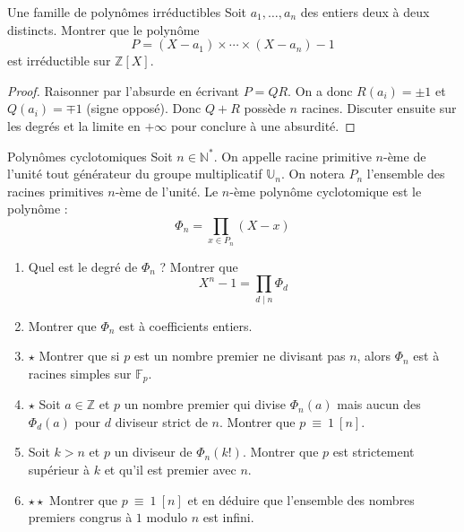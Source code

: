 \documentclass[french,a4paper]{article}
\newcommand{\N}{\mathbb{N}}
\newcommand{\Z}{\mathbb{Z}}
\newcommand{\U}{\mathbb{U}}
\newcommand{\st}{^*}
\newcommand{\F}{\mathbb{F}}
\theoremstyle{plain}
\theoremstyle{definition}
\theoremstyle{remark}
\begin{document}
\begin{ex}[Morlot]{Une famille de polynômes irréductibles}
	Soit $a_1,\ldots,a_n$ des entiers deux à deux distincts. Montrer que le polynôme $$P=(X-a_1)\times\cdots\times(X-a_n)-1$$ est irréductible sur $\Z[X]$.
\end{ex}
\begin{proof}
	Raisonner par l'absurde en écrivant $P=QR$. On a donc $R(a_i)=\pm 1$ et $Q(a_i)=\mp 1$ (signe opposé). Donc $Q+R$ possède $n$ racines. Discuter ensuite sur les degrés et la limite en $+\infty$ pour conclure à une absurdité.
\end{proof}

\begin{ex}[Révisions]{Polynômes cyclotomiques}
	Soit $n\in\N\st$. On appelle racine primitive $n$-ème de l'unité tout générateur du groupe multiplicatif $\U_n$. On notera $P_n$ l'ensemble des racines primitives $n$-ème de l'unité. Le $n$-ème polynôme cyclotomique est le polynôme : $$\Phi_n=\prod_{x\in P_n}(X-x)$$
	\begin{enumerate}
		\item Quel est le degré de $\Phi_n$ ? Montrer que $$X^n-1=\prod_{d\mid n}\Phi_d$$
		\item Montrer que $\Phi_n$ est à coefficients entiers.
		\item $\star$ Montrer que si $p$ est un nombre premier ne divisant pas $n$, alors $\Phi_n$ est à racines simples sur $\F_p$.
		\item $\star$ Soit $a\in\Z$ et $p$ un nombre premier qui divise $\Phi_n(a)$ mais aucun des $\Phi_d(a)$ pour $d$ diviseur strict de $n$. Montrer que $p\ \equiv\ 1\ [n]$.
		\item Soit $k>n$ et $p$ un diviseur de $\Phi_n(k!)$. Montrer que $p$ est strictement supérieur à $k$ et qu'il est premier avec $n$.
		\item $\star\star$ Montrer que $p\ \equiv\ 1\ [n]$ et en déduire que l'ensemble des nombres premiers congrus à $1$ modulo $n$ est infini.
	\end{enumerate}
\end{ex}
\end{document}
